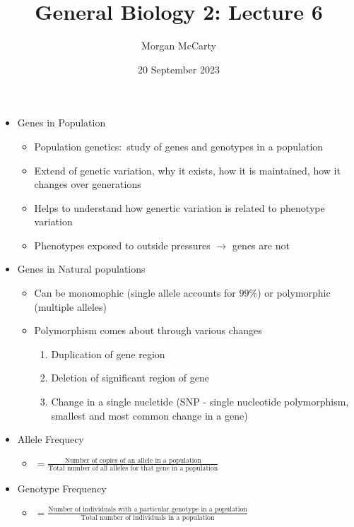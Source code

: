 \documentclass[12pt]{article}
\title{
    General Biology 2: Lecture 6}
\author{Morgan McCarty}
\date{20 September 2023}
\begin{document}
    \maketitle

    \begin{itemize}
        \item Genes in Population
        \begin{itemize}
            \item Population genetics:\ study of genes and genotypes in a population
            \item Extend of genetic variation, why it exists, how it is maintained, how it changes over generations
            \item Helps to understand how genertic variation is related to phenotype variation
            \item Phenotypes exposed to outside pressures $\rightarrow$ genes are not
        \end{itemize}
        \item Genes in Natural populations
        \begin{itemize}
            \item Can be monomophic (single allele accounts for $99\%$) or polymorphic (multiple alleles)
            \item Polymorphism comes about through various changes
            \begin{enumerate}
                \item Duplication of gene region
                \item Deletion of significant region of gene
                \item Change in a single nucletide (SNP - single nucleotide polymorphism, smallest and most common change in a gene)
            \end{enumerate}
        \end{itemize}
        \item Allele Frequecy
        \begin{itemize}
            \item $= \frac{\text{Number of copies of an allele in a population}}{\text{Total number of all alleles for that gene in a population}}$
        \end{itemize}
        \item Genotype Frequency
        \begin{itemize}
            \item $= \frac{\text{Number of individuals with a particular genotype in a population}}{\text{Total number of individuals in a population}}$

\end{itemize}
\end{itemize}
\end{document}
